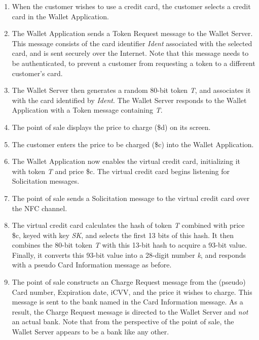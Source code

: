 \begin{enumerate}
\item When the customer wishes to use a credit card, the customer selects a credit card in the Wallet Application.

\item The Wallet Application sends a Token Request message to the Wallet Server.
    This message consists of the card identifier \emph{Ident} associated with the selected card, and is sent securely over the Internet.
    Note that this message needs to be authenticated, to prevent a customer from requesting a token to a different customer's card.

\item The Wallet Server then generates a random 80-bit token \emph{T}, and associates it with the card identified by \emph{Ident}.
    The Wallet Server responds to the Wallet Application with a Token message containing \emph{T}.

\item The point of sale displays the price to charge (\$d) on its screen.

\item The customer enters the price to be charged (\$c) into the Wallet Application.

\item The Wallet Application now enables the virtual credit card, initializing it with token \emph{T} and price \$c.
    The virtual credit card begins listening for Solicitation messages.

\item The point of sale sends a Solicitation message to the virtual credit card over the NFC channel.

\item The virtual credit card calculates the hash of token \emph{T} combined with price \$c, keyed with key \emph{SK}, and selects the first 13 bits of this hash.
    It then combines the 80-bit token \emph{T} with this 13-bit hash to acquire a 93-bit value.
    Finally, it converts this 93-bit value into a 28-digit number \emph{k}, and responds with a pseudo Card Information message as before.

\item The point of sale constructs an Charge Request message from the (pseudo) Card number, Expiration date, iCVV, and the price it wishes to charge.
    This message is sent to the bank named in the Card Information message.
    As a result, the Charge Request message is directed to the Wallet Server and \emph{not} an actual bank.
    Note that from the perspective of the point of sale, the Wallet Server appears to be a bank like any other.


\end{enumerate}
